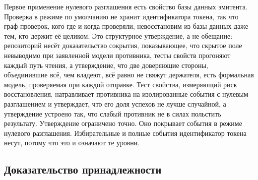 Первое применение нулевого разглашения есть свойство базы данных эмитента. Проверка в режиме по
умолчанию не хранит идентификатора токена, так что граф проверок, кого где и когда проверяли,
невосстановим из базы данных даже тем, кто держит её целиком. Это структурное утверждение, а не
обещание: репозиторий несёт доказательство сокрытия, показывающее, что скрытое поле невыводимо при
заявленной модели противника, тесты свойств прогоняют каждый путь чтения, а утверждение, что две
доверяющие стороны, объединившие всё, чем владеют, всё равно не свяжут держателя, есть формальная
модель, проверяемая при каждой отправке. Тест свойства, измеряющий риск восстановления, натравливает
противника на изолированные события с нулевым разглашением и утверждает, что его доля успехов не
лучше случайной, а утверждение устроено так, что слабый противник не в силах польстить результату.
Утверждение ограничено точно. Оно покрывает события в режиме нулевого разглашения. Избирательные и
полные события идентификатор токена несут, потому что это и означают те уровни. \sImpl

\subsection{Доказательство принадлежности}


